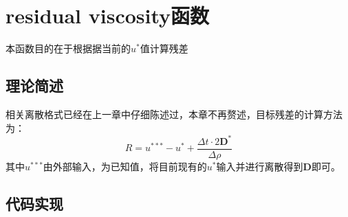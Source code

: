 \documentclass[lang=cn,11pt,a4paper]{elegantpaper}
\begin{document}
\section{residual viscosity函数}
本函数目的在于根据据当前的$u^*$值计算残差
\subsection{理论简述}
相关离散格式已经在上一章中仔细陈述过，本章不再赘述，目标残差的计算方法为：
\begin{equation}
    R = u^{***}-u^{*}+\frac{\Delta t \cdot 2\mathbf{D^*}}{\Delta\rho}
\end{equation}
其中$u^{***}$由外部输入，为已知值，将目前现有的$u^*$输入并进行离散得到$\mathbf{D}$即可。
\subsection{代码实现}
\end{document}
